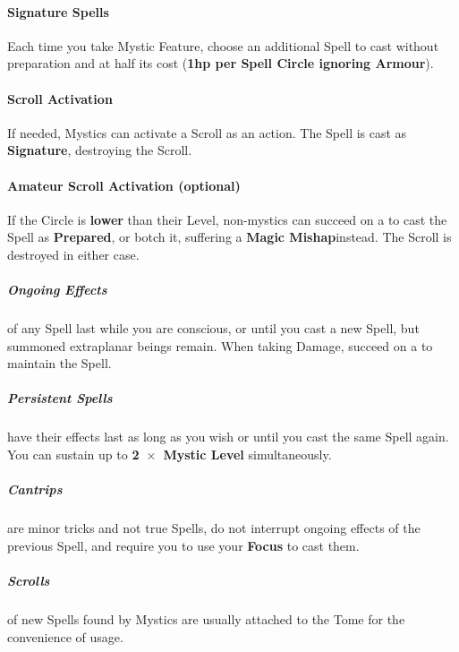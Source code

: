 \documentclass[itdr/core]{subfiles}
\begin{document}
\paragraph{Signature Spells}
Each time you take Mystic Feature, choose an additional Spell to cast without preparation and at half its cost (\textbf{1hp per Spell Circle ignoring Armour}).

\paragraph{Scroll Activation}
If needed, Mystics can activate a Scroll as an action. The Spell is cast as \textbf{Signature}, destroying the Scroll.

\vspace{-0.5ex}
\begin{dbox}
	\paragraph{Amateur Scroll Activation (optional)}
	If the Circle is \textbf{lower} than their Level, non-mystics can succeed on a  to cast the Spell as \mbox{\textbf{Prepared}}, or botch it, suffering a \textbf{Magic Mishap}\footnotemark[1] \mbox{instead.} The Scroll is destroyed in either case.
\end{dbox}
\vspace{-0.5ex}

\subparagraph{Ongoing Effects} of any Spell last while you are conscious, or until you cast a new Spell, but summoned extraplanar beings remain. When taking Damage, succeed on a  to maintain the Spell.

\subparagraph{Persistent Spells} have their effects last as long as you wish or until you cast the same Spell again. You can sustain up to \textbf{2~$\times$~Mystic Level} simultaneously.

\enlargethispage{1ex}
\break

\subparagraph{Cantrips} are minor tricks and not true Spells, do not interrupt ongoing effects of the previous Spell, and require you to use your \textbf{Focus} to cast them.

\subparagraph{Scrolls} of new Spells found by Mystics are usually attached to the Tome for the convenience of usage.
\end{document}
